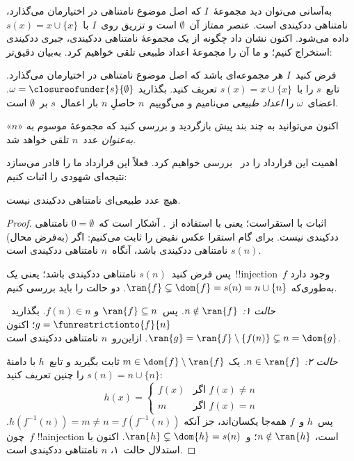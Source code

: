 \documentclass[../../../include/open-logic-section]{subfiles}
\begin{document}
به‌آسانی می‌توان دید مجموعهٔ~$I$ که اصل موضوع نامتناهی در اختیارمان
می‌گذارد، نامتناهی ددکیندی است. عنصر ممتاز آن~$\emptyset$ است و تزریق
روی~$I$ با~$s(x)=x\cup\{x\}$ داده می‌شود. اکنون
 نشان داد
چگونه از یک مجموعهٔ نامتناهی ددکیندی، جبری ددکیندی استخراج کنیم؛ و ما آن
را مجموعهٔ اعداد طبیعی تلقی خواهیم کرد. به‌بیان دقیق‌تر:
\begin{defn}
فرض کنید~$I$ هر مجموعه‌ای باشد که اصل موضوع نامتناهی در اختیارمان می‌گذارد.
تابع~$s$ را با~$s(x)=x\cup\{x\}$ تعریف کنید. بگذارید
$\omega = \closureofunder{s}{\emptyset}$. اعضای~$\omega$ را
\emph{اعداد طبیعی} می‌نامیم و می‌گوییم~$n$ حاصلِ $n$ بار اعمال~$s$
بر~$\emptyset$ است.
\end{defn}

اکنون می‌توانید به چند بند پیش بازگردید و بررسی کنید که مجموعهٔ موسوم به
«$n$» \emph{به‌عنوان} عدد~$n$ تلقی خواهد شد.

اهمیت این قرارداد را در~ بررسی خواهیم کرد. فعلاً
این قرارداد ما را قادر می‌سازد نتیجه‌ای شهودی را اثبات کنیم:

\begin{prop}
هیچ عدد طبیعی‌ای نامتناهی ددکیندی نیست.
\end{prop}

\begin{proof}
اثبات با استقراست؛ یعنی با استفاده
از~. آشکار است
که~$0=\emptyset$ نامتناهی ددکیندی نیست. برای گام استقرا عکس نقیض را ثابت
می‌کنیم: اگر (به‌فرض محال) $s(n)$ نامتناهی ددکیندی باشد، آنگاه~$n$
نامتناهی ددکیندی است.

پس فرض کنید~$s(n)$ نامتناهی ددکیندی باشد؛ یعنی یک~!!{injection}~$f$ وجود
دارد به‌طوری‌که
$\ran{f}\subsetneq \dom{f} = s(n) = n \cup \{n\}$. دو حالت را باید
بررسی کنیم.

\emph{حالت ۱: $n \notin \ran{f}$.} پس~$\ran{f} \subseteq n$ و
$f(n) \in n$. بگذارید~$g = \funrestrictionto{f}{n}$؛ اکنون
$\ran{g} = \ran{f} \setminus \{f(n)\} \subsetneq n = \dom{g}$.
ازاین‌رو~$n$ نامتناهی ددکیندی است.

\emph{حالت ۲: $n \in \ran{f}$.} یک
$m \in \dom{f} \setminus \ran{f}$ ثابت بگیرید و تابع~$h$ با دامنهٔ
$s(n)=n\cup\{n\}$ را چنین تعریف کنید:
\[
h(x) =
	\begin{cases}
		f(x) & \text{اگر }f(x) \neq n\\
		m & \text{اگر }f(x)=n
	\end{cases}
\]
پس~$h$ و~$f$ همه‌جا یکسان‌اند، جز آنکه
$h(f^{-1}(n)) = m \neq n = f(f^{-1}(n))$. چون~$f$ !!a{injection} است،
$n \notin \ran{h}$؛ و~$\ran{h} \subsetneq \dom{h} = s(n)$. اکنون با
استدلال حالت~۱، $n$ نامتناهی ددکیندی است.
\end{proof}
\end{document}
